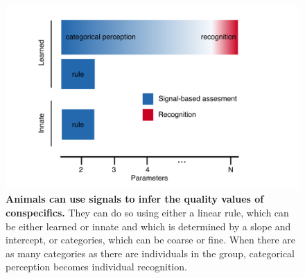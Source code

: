 \begin{figure}
\includegraphics[width=6.85in]{figures/schematic_cropped.png}
\caption{\sffamily\small\textbf{Animals can use signals to infer the quality values of conspecifics.} They can do so using either a linear rule, which can be either learned or innate and which is determined by a slope and intercept, or categories, which can be coarse or fine. When there are as many categories as there are individuals in the group, categorical perception becomes individual recognition.}
\label{schematic}
\end{figure}

